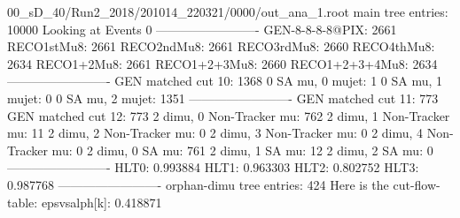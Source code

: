 00_sD_40/Run2_2018/201014_220321/0000/out_ana_1.root
main tree entries: 10000
Looking at Events 0
-------------------------
GEN-8-8-8-8@PIX: 2661
RECO1stMu8: 2661
RECO2ndMu8: 2661
RECO3rdMu8: 2660
RECO4thMu8: 2634
RECO1+2Mu8: 2661
RECO1+2+3Mu8: 2660
RECO1+2+3+4Mu8: 2634
-------------------------
GEN matched cut 10: 1368
0 SA mu, 0 mujet: 1
0 SA mu, 1 mujet: 0
0 SA mu, 2 mujet: 1351
-------------------------
GEN matched cut 11: 773
GEN matched cut 12: 773
2 dimu, 0 Non-Tracker mu: 762
2 dimu, 1 Non-Tracker mu: 11
2 dimu, 2 Non-Tracker mu: 0
2 dimu, 3 Non-Tracker mu: 0
2 dimu, 4 Non-Tracker mu: 0
2 dimu, 0 SA mu: 761
2 dimu, 1 SA mu: 12
2 dimu, 2 SA mu: 0
-------------------------
HLT0: 0.993884
HLT1: 0.963303
HLT2: 0.802752
HLT3: 0.987768
-------------------------
orphan-dimu tree entries: 424
Here is the cut-flow-table:
epsvsalph[k]: 0.418871
        
